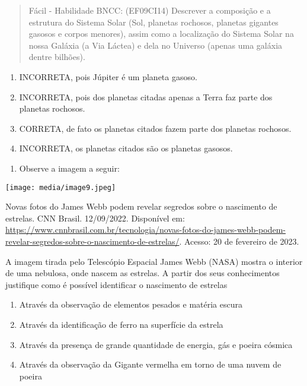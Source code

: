 \begin{quote}
Fácil - Habilidade BNCC: (EF09CI14) Descrever a composição e a estrutura
do Sistema Solar (Sol, planetas rochosos, planetas gigantes gasosos e
corpos menores), assim como a localização do Sistema Solar na nossa
Galáxia (a Via Láctea) e dela no Universo (apenas uma galáxia dentre
bilhões).
\end{quote}

\begin{enumerate}
\def\labelenumi{(\Alph{enumi})}
\item
  INCORRETA, pois Júpiter é um planeta gasoso.
\item
  INCORRETA, pois dos planetas citadas apenas a Terra faz parte dos
  planetas rochosos.
\item
  CORRETA, de fato os planetas citados fazem parte dos planetas
  rochosos.
\item
  INCORRETA, os planetas citados são os planetas gasosos.
\end{enumerate}

\begin{enumerate}
\def\labelenumi{\arabic{enumi})}
\item
  Observe a imagem a seguir:
\end{enumerate}

\texttt{[image: media/image9.jpeg]}

Novas fotos do James Webb podem revelar segredos sobre o nascimento de
estrelas. CNN Brasil. 12/09/2022. Disponível em:
\url{https://www.cnnbrasil.com.br/tecnologia/novas-fotos-do-james-webb-podem-revelar-segredos-sobre-o-nascimento-de-estrelas/}.
Acesso: 20 de fevereiro de 2023.

A imagem tirada pelo Telescópio Espacial James Webb (NASA) mostra o
interior de uma nebulosa, onde nascem as estrelas. A partir dos seus
conhecimentos justifique como é possível identificar o nascimento de
estrelas

\begin{enumerate}
\def\labelenumi{(\Alph{enumi})}
\item
  Através da observação de elementos pesados e matéria escura
\item
  Através da identificação de ferro na superfície da estrela
\item
  Através da presença de grande quantidade de energia, gás e poeira
  cósmica
\item
  Através da observação da Gigante vermelha em torno de uma nuvem de
  poeira
\end{enumerate}

